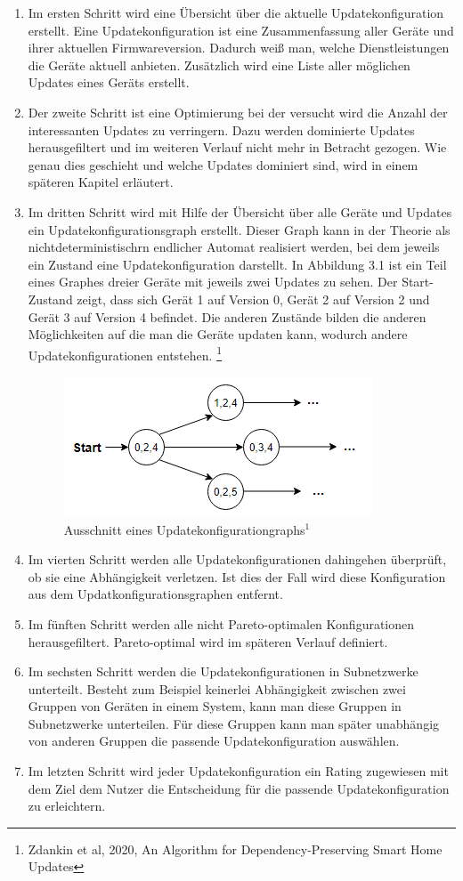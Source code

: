 \begin{enumerate}
\item Im ersten Schritt wird eine Übersicht über die aktuelle Updatekonfiguration erstellt. Eine Updatekonfiguration ist eine Zusammenfassung
aller Geräte und ihrer aktuellen Firmwareversion. Dadurch weiß man, welche Dienstleistungen die Geräte aktuell anbieten. Zusätzlich wird eine Liste
aller möglichen Updates eines Geräts erstellt. 
\item Der zweite Schritt ist eine Optimierung bei der versucht wird die Anzahl der interessanten Updates zu verringern. Dazu werden dominierte 
Updates herausgefiltert und im weiteren Verlauf nicht mehr in Betracht gezogen. Wie genau dies geschieht und welche Updates dominiert sind, wird
in einem späteren Kapitel erläutert.
\item Im dritten Schritt wird mit Hilfe der Übersicht über alle Geräte und Updates ein Updatekonfigurationsgraph erstellt. Dieser Graph kann in der
Theorie als nichtdeterministischrn endlicher Automat realisiert werden, bei dem jeweils ein Zustand eine Updatekonfiguration darstellt. In Abbildung 3.1
ist ein Teil eines Graphes dreier Geräte mit jeweils zwei Updates zu sehen. Der Start-Zustand zeigt, dass sich Gerät 1 auf Version 0, Gerät 2 auf Version 2 und Gerät 3 auf Version 4
befindet. Die anderen Zustände bilden die anderen Möglichkeiten auf die man die Geräte updaten kann, wodurch andere Updatekonfigurationen entstehen.
\footnote{Zdankin et al, 2020, An Algorithm for Dependency-Preserving Smart Home Updates}
\begin{figure}[h]
\centering
\includegraphics{"UCG"}
\caption{Ausschnitt eines Updatekonfigurationgraphs\( ^1\) }
\label{fig:Prob1:MEA}
\end{figure}
\item Im vierten Schritt werden alle Updatekonfigurationen dahingehen überprüft, ob sie eine Abhängigkeit verletzen. Ist dies der Fall wird diese
Konfiguration aus dem Updatkonfigurationsgraphen entfernt.
\item Im fünften Schritt werden alle nicht Pareto-optimalen Konfigurationen herausgefiltert. Pareto-optimal wird im späteren Verlauf definiert.
\item Im sechsten Schritt werden die Updatekonfigurationen in Subnetzwerke unterteilt. Besteht zum Beispiel keinerlei Abhängigkeit zwischen zwei
Gruppen von Geräten in einem System, kann man diese Gruppen in Subnetzwerke unterteilen. Für diese Gruppen kann man später unabhängig von
anderen Gruppen die passende Updatekonfiguration auswählen.
\item Im letzten Schritt wird jeder Updatekonfiguration ein Rating zugewiesen mit dem Ziel dem Nutzer die Entscheidung für die passende
Updatekonfiguration zu erleichtern.
\end{enumerate}

